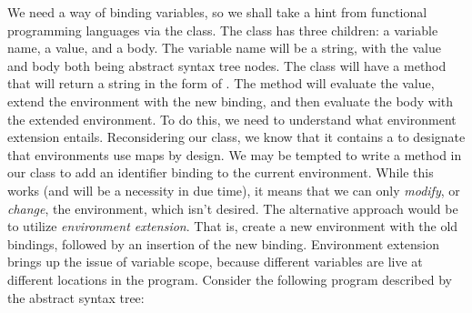 We need a way of binding variables, so we shall take a hint from functional programming languages via the  class. The  class has three children: a variable name, a value, and a body. The variable name will be a string, with the value and body both being abstract syntax tree nodes. The  class will have a  method that will return a string in the form of . The  method will evaluate the value, extend the environment with the new binding, and then evaluate the body with the extended environment. To do this, we need to understand what environment extension entails. Reconsidering our  class, we know that it contains a  to designate that environments use maps by design. We may be tempted to write a  method in our  class to add an identifier binding to the current environment. While this works (and will be a necessity in due time), it means that we can only \textit{modify}, or \textit{change}, the environment, which isn't desired. The alternative approach would be to utilize \textit{environment extension}. That is, create a new environment with the old bindings, followed by an insertion of the new binding. Environment extension brings up the issue of variable scope, because different variables are live at different locations in the program. Consider the following program described by the abstract syntax tree:

